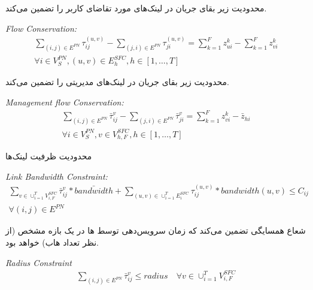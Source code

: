 محدودیت زیر بقای جریان در لینک‌های مورد تقاضای کاربر را تضمین می‌کند.
\begin{latin}
    \textit{Flow Conservation:}
    \begin{align}
        \sum_{(i,j) \in E^{PN}} \tau_{ij}^{(u,v)} - \sum_{(j,i) \in E^{PN}} \tau_{ji}^{(u,v)} = \sum_{k=1}^{F} z_{ui}^{k} - \sum_{k=1}^{F} z_{vi}^{k} \nonumber \\
        \forall i \in V_{S}^{PN}, (u,v) \in E_{h}^{SFC}, h \in [1,\ldots, T]
    \end{align}
\end{latin}

محدودیت زیر بقای جریان در لینک‌های مدیریتی را تضمین می‌کند.
\begin{latin}
    \textit{Management flow Conservation:}
    \begin{align}
        \sum_{(i,j) \in E^{PN}} \bar{\tau}_{ij}^{v} - \sum_{(j,i) \in E^{PN}} \bar{\tau}_{ji}^{v} = \sum_{k=1}^{F} z_{vi}^{k} - \bar{z}_{hi} \nonumber \\
        \forall i \in V_{S}^{PN}, v \in V_{h, F}^{SFC}, h \in [1,\ldots, T]
    \end{align}
\end{latin}

محدودیت ظرفیت لینک‌ها
\begin{latin}
    \textit{Link Bandwidth Constraint:}
    \begin{align}
        \sum_{v \in \cup_{i=1}^{T} V_{i,F}^{SFC}} \bar{\tau}_{ij}^{v} * \bar{bandwidth} + \sum_{(u,v) \in \cup_{i=1}^{T} E_{i}^{SFC}} \tau_{ij}^{(u,v)} * bandwidth(u,v) \le C_{ij} \nonumber \\
        \forall (i, j) \in E^{PN}
    \end{align}
\end{latin}

شعاع همسایگی تضمین می‌کند که زمان سرویس‌دهی توسط
ها
در یک بازه مشخص (از نظر تعداد هاب)
خواهد بود.
\begin{latin}
    \textit{Radius Constraint}
    \begin{align}
        \sum_{(i, j) \in E^{PN}} \bar{\tau}_{ij}^{v} \le radius
        \quad
        \forall v \in \cup_{i=1}^T V_{i, F}^{SFC}
    \end{align}
\end{latin}